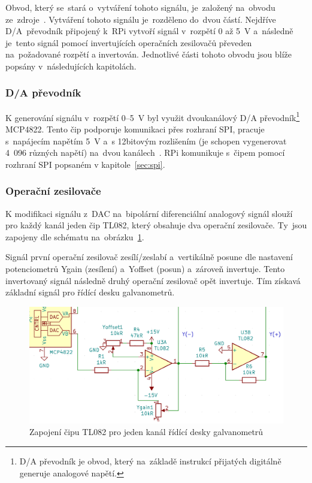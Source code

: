 Obvod, který se~stará o~vytváření tohoto signálu, je~založený na~obvodu ze~zdroje~\cite{lasershow-with-real-galvos}.
Vytváření tohoto signálu je~rozděleno do~dvou částí. Nejdříve D/A~převodník připojený k~RPi vytvoří signál v~rozpětí 0 až 5~V a~následně je~tento signál pomocí invertujících operačních zesilovačů převeden na~požadované rozpětí a invertován.
Jednotlivé části tohoto obvodu jsou blíže popsány v~následujících kapitolách.

\subsubsection{D/A převodník}
K generování signálu v~rozpětí 0--5~V byl využit dvoukanálový D/A převodník\footnote{D/A převodník je obvod, který na~základě instrukcí přijatých digitálně generuje analogové napětí.} MCP4822.
Tento čip podporuje komunikaci přes rozhraní SPI, pracuje s~napájecím napětím 5~V a~s 12bitovým rozlišením (je schopen vygenerovat 4~096 různých napětí) na~dvou kanálech~\cite{mcp4822-dsh}.
RPi komunikuje s~čipem pomocí rozhraní SPI popsaném v kapitole~\ref{sec:spi}.

\subsubsection{Operační zesilovače~\cite{tl082-dsh}}
K modifikaci signálu z~DAC na~bipolární diferenciální analogový signál slouží pro každý kanál jeden čip TL082, který obsahuje dva operační zesilovače. Ty~jsou zapojeny dle schématu na~obrázku~\ref{fig:ilda_amps-scheme}.

Signál první operační zesilovač zesílí/zeslabí a~vertikálně posune dle nastavení potenciometrů Ygain (zesílení) a~Yoffset (posun) a~zároveň invertuje. Tento invertovaný signál následně druhý operační zesilovač opět invertuje. Tím získavá základní signál pro řídící desku galvanometrů.

\begin{figure}[htb]
  \centering
  \includegraphics[width=1\textwidth]{img/ilda_amps.png}
  \caption{\label{fig:ilda_amps-scheme} Zapojení čipu TL082 pro jeden kanál řídící desky galvanometrů}
\end{figure}

